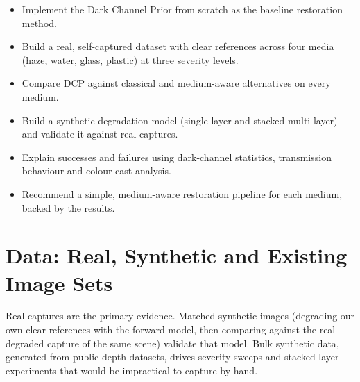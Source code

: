 \documentclass[12pt,a4paper]{article}
\begin{document}
\begin{itemize}[nosep]
  \item Implement the Dark Channel Prior from scratch as the baseline
        restoration method.
  \item Build a real, self-captured dataset with clear references across
        four media (haze, water, glass, plastic) at three severity
        levels.
  \item Compare DCP against classical and medium-aware alternatives on
        every medium.
  \item Build a synthetic degradation model (single-layer and stacked
        multi-layer) and validate it against real captures.
  \item Explain successes and failures using dark-channel statistics,
        transmission behaviour and colour-cast analysis.
  \item Recommend a simple, medium-aware restoration pipeline for each
        medium, backed by the results.
\end{itemize}

\section{Data: Real, Synthetic and Existing Image Sets}
\label{sec:data}

Real captures are the primary evidence. Matched synthetic images
(degrading our own clear references with the forward model, then
comparing against the real degraded capture of the same scene) validate
that model. Bulk synthetic data, generated from public depth datasets,
drives severity sweeps and stacked-layer experiments that would be
impractical to capture by hand.
\end{document}
